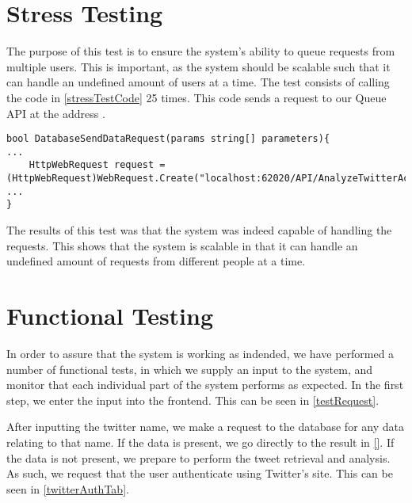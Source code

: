 \section{Stress Testing}
The purpose of this test is to ensure the system's ability to queue requests
from multiple users. This is important, as the system should be scalable such
that it can handle an undefined amount of users at a time. The test consists of
calling the code in \autoref{stressTestCode} 25 times. This code sends a request
to our Queue API at the address .\nl

\begin{minipage}[H]{\linewidth}
\begin{lstlisting}[caption = Code initiating the stress test, label = stressTestCode] 
bool DatabaseSendDataRequest(params string[] parameters){
...
	HttpWebRequest request = (HttpWebRequest)WebRequest.Create("localhost:62020/API/AnalyzeTwitterAccount");
...
}
\end{lstlisting}
\end{minipage}

The results of this test was that the system was indeed capable of handling the
requests. This shows that the system is scalable in that it can handle an
undefined amount of requests from different people at a time.


\section{Functional Testing}
In order to assure that the system is working as indended, we have performed a
number of functional tests, in which we supply an input to the system, and
monitor that each individual part of the system performs as expected. In the
first step, we enter the input into the frontend. This can be seen in
\autoref{testRequest}.\nl 


After inputting the twitter name, we make a request to the database for any data
relating to that name. If the data is present, we go directly to the result in
\autoref{}. If the data is not present, we prepare to perform the tweet
retrieval and analysis. As such, we request that the user authenticate using
Twitter's site. This can be seen in \autoref{twitterAuthTab}.\nl


